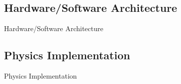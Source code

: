 \subsection{Hardware/Software Architecture}
\begin{frame}{Hardware/Software Architecture}
\begin{onlyenv}
\end{onlyenv}
\end{frame}

\subsection{Physics Implementation}
\begin{frame}{Physics Implementation}
\end{frame}